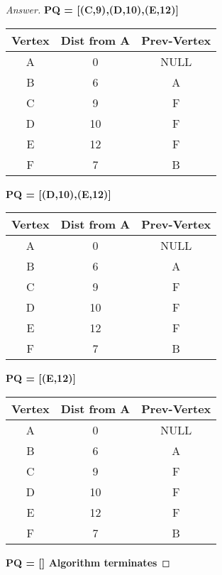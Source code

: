 \documentclass[11pt]{article}
\theoremstyle{definition}
\theoremstyle{definition}
\theoremstyle{definition}
\begin{document}
\begin{proof}[Answer]
\textbf{PQ = [(C,9),(D,10),(E,12)]}

\begin{center}
\begin{tabular}[c]{|c|c|c|} 
	Vertex &Dist from A &Prev-Vertex \\\hline
	A &0 & NULL\\
	B &6 & A\\
	C &9& F\\
	D &10 & F\\
	E &12 & F\\
	F &7 & B\\
\end{tabular}
\end{center}	

\textbf{PQ = [(D,10),(E,12)]}

\begin{center}
\begin{tabular}[c]{|c|c|c|} 
	Vertex &Dist from A &Prev-Vertex \\\hline
	A &0 & NULL\\
	B &6 & A\\
	C &9& F\\
	D &10 & F\\
	E &12 & F\\
	F &7 & B\\
\end{tabular}
\end{center}	

\textbf{PQ = [(E,12)]}

\begin{center}
\begin{tabular}[c]{|c|c|c|} 
	Vertex &Dist from A &Prev-Vertex \\\hline
	A &0 & NULL\\
	B &6 & A\\
	C &9& F\\
	D &10 & F\\
	E &12 & F\\
	F &7 & B\\
\end{tabular}
\end{center}	

\textbf{PQ = [] Algorithm terminates}
\end{proof}







\end{document}
